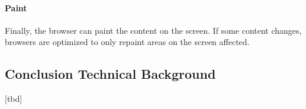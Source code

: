 

\paragraph{Paint}

Finally, the browser can paint the content on the screen.
If some content changes, browsers are optimized to only repaint areas on the screen affected.  %




















\subsection{Conclusion Technical Background}

[tbd]






